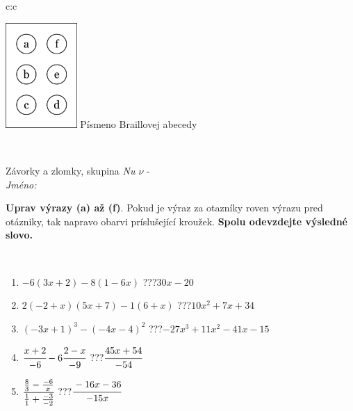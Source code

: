 \documentclass[10pt]{report}
\begin{document}
\begin{tabular}{c:c}
\begin{minipage}[c][104.5mm][t]{0.5\linewidth}
\begin{center}
\begin{minipage}{0.20\linewidth}
\begin{center}
\includegraphics[height=40mm]{../images/braille.png}
{\small Písmeno Braillovej abecedy}
\end{center}
\end{minipage}
\end{center}
\end{minipage}
\\ \hdashline
\begin{minipage}[c][104.5mm][t]{0.5\linewidth}
\begin{center}
\vspace{7mm}
{\huge Závorky a zlomky, skupina \textit{Nu $\nu$} -}\\[5mm]
\textit{Jméno:}\phantom{xxxxxxxxxxxxxxxxxxxxxxxxxxxxxxxxxxxxxxxxxxxxxxxxxxxxxxxxxxxxxxxxx}\\[5mm]
\begin{minipage}{0.95\linewidth}
\begin{center}
\textbf{Uprav výrazy (a) až (f)}. Pokud je výraz za otazníky roven výrazu pred otázniky, tak napravo obarvi príslušející kroužek. \textbf{Spolu odevzdejte výsledné slovo.}
\end{center}
\end{minipage}
\\[1mm]
\begin{minipage}{0.79\linewidth}
\begin{center}
\begin{varwidth}{\linewidth}
\begin{enumerate}
\normalsize
\item $-6(3x+2)-8(1-6x)$\quad \dotfill\; ???\;\dotfill \quad $30x-20$
\item $2(-2+x)(5x+7)-1(6+x)$\quad \dotfill\; ???\;\dotfill \quad $10x^2+7x+34$
\item $(-3x+1)^3-(-4x-4)^2$\quad \dotfill\; ???\;\dotfill \quad $-27x^3+11x^2-41x-15$
\item $\cfrac{x+2}{-6}-6\cfrac{2-x}{-9}$\quad \dotfill\; ???\;\dotfill \quad $\cfrac{45x+54}{-54}$
\item $\cfrac{\frac{8}{3}-\frac{-6}{x}}{\frac{1}{1}+\frac{-3}{-2}}$\quad \dotfill\; ???\;\dotfill \quad $\cfrac{-16x-36}{-15x}$

\end{enumerate}
\end{varwidth}
\end{center}
\end{minipage}
\end{center}
\end{minipage}
\end{tabular}
\end{document}

